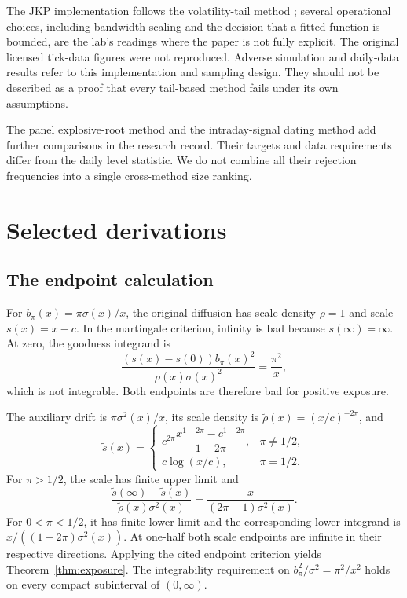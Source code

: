 The JKP implementation follows the volatility-tail method
\cite{jarrow2011detect}; several operational choices, including
bandwidth scaling and the decision that a fitted function is bounded,
are the lab's readings where the paper is not fully explicit. The
original licensed tick-data figures were not reproduced. Adverse
simulation and daily-data results refer to this implementation and
sampling design. They should not be described as a proof that every
tail-based method fails under its own assumptions.

The panel explosive-root method \cite{liu2022panel} and the
intraday-signal dating method \cite{obayashi2015lifetime} add further
comparisons in the research record. Their targets and data requirements
differ from the daily level statistic. We do not combine all their
rejection frequencies into a single cross-method size ranking.

\clearpage
\section{Selected derivations}\label{app:proofs}
\subsection{The endpoint calculation}
For $b_\pi(x)=\pi\sigma(x)/x$, the original diffusion has scale density
$\rho=1$ and scale $s(x)=x-c$. In the martingale criterion, infinity
is bad because $s(\infty)=\infty$. At zero, the goodness integrand is
\[
 \frac{(s(x)-s(0))b_\pi(x)^2}{\rho(x)\sigma(x)^2}
     =\frac{\pi^2}{x},
\]
which is not integrable. Both endpoints are therefore bad for positive
exposure.

The auxiliary drift is $\pi\sigma^2(x)/x$, its scale density is
$\widetilde\rho(x)=(x/c)^{-2\pi}$, and
\[
 \widetilde s(x)=
 \begin{cases}
 c^{2\pi}\dfrac{x^{1-2\pi}-c^{1-2\pi}}{1-2\pi},&\pi\ne1/2,\\[4pt]
 c\log(x/c),&\pi=1/2.
 \end{cases}
\]
For $\pi>1/2$, the scale has finite upper limit and
\[
 \frac{\widetilde s(\infty)-\widetilde s(x)}
      {\widetilde\rho(x)\sigma^2(x)}
   =\frac{x}{(2\pi-1)\sigma^2(x)}.
\]
For $0<\pi<1/2$, it has finite lower limit and the corresponding
lower integrand is $x/((1-2\pi)\sigma^2(x))$. At one-half both
scale endpoints are infinite in their respective directions. Applying
the cited endpoint criterion yields Theorem~\ref{thm:exposure}.
The integrability requirement on $b_\pi^2/\sigma^2=\pi^2/x^2$
holds on every compact subinterval of $(0,\infty)$.

